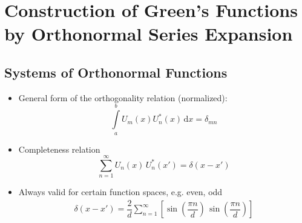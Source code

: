 \section{Construction of Green's Functions by Orthonormal Series Expansion}
\subsection{Systems of Orthonormal Functions}
\begin{itemize}
        \item General form of the orthogonality relation (normalized):
\begin{equation*}
  \int\limits_{a}^{b}U_{m}(x)U_{n}^{*}(x)\,\mathrm{d}x = \delta_{mn}
\end{equation*}
  \item Completeness relation
        \begin{equation*}
          \sum\limits_{n=1}^{\infty} U_{n}(x)\,U^{*}_{n}(x') = \delta(x - x')
        \end{equation*}
  \item Always valid for certain function spaces, e.g. even, odd
        \begin{align*}
          \delta(x - x') = \dfrac{2}{d} \sum\limits_{n=1}^{\infty}
          \left[
          \sin\left(\dfrac{\pi n}{d}\right)
          \,
          \sin\left(\dfrac{\pi n}{d}\right)
          \right]
        \end{align*}
\end{itemize}
